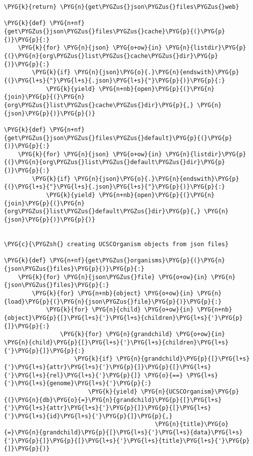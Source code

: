 \begin{Verbatim}[commandchars=\\\{\}]
    \PYG{k}{return} \PYG{n}{get\PYGZus{}json\PYGZus{}files\PYGZus{}web}

\PYG{k}{def} \PYG{n+nf}{get\PYGZus{}json\PYGZus{}files\PYGZus{}cache}\PYG{p}{(}\PYG{p}{)}\PYG{p}{:}
    \PYG{k}{for} \PYG{n}{json} \PYG{o+ow}{in} \PYG{n}{listdir}\PYG{p}{(}\PYG{n}{org\PYGZus{}list\PYGZus{}cache\PYGZus{}dir}\PYG{p}{)}\PYG{p}{:}
        \PYG{k}{if} \PYG{n}{json}\PYG{o}{.}\PYG{n}{endswith}\PYG{p}{(}\PYG{l+s}{"}\PYG{l+s}{.json}\PYG{l+s}{"}\PYG{p}{)}\PYG{p}{:}
            \PYG{k}{yield} \PYG{n+nb}{open}\PYG{p}{(}\PYG{n}{join}\PYG{p}{(}\PYG{n}{org\PYGZus{}list\PYGZus{}cache\PYGZus{}dir}\PYG{p}{,} \PYG{n}{json}\PYG{p}{)}\PYG{p}{)}

\PYG{k}{def} \PYG{n+nf}{get\PYGZus{}json\PYGZus{}files\PYGZus{}default}\PYG{p}{(}\PYG{p}{)}\PYG{p}{:}
    \PYG{k}{for} \PYG{n}{json} \PYG{o+ow}{in} \PYG{n}{listdir}\PYG{p}{(}\PYG{n}{org\PYGZus{}list\PYGZus{}default\PYGZus{}dir}\PYG{p}{)}\PYG{p}{:}
        \PYG{k}{if} \PYG{n}{json}\PYG{o}{.}\PYG{n}{endswith}\PYG{p}{(}\PYG{l+s}{"}\PYG{l+s}{.json}\PYG{l+s}{"}\PYG{p}{)}\PYG{p}{:}
            \PYG{k}{yield} \PYG{n+nb}{open}\PYG{p}{(}\PYG{n}{join}\PYG{p}{(}\PYG{n}{org\PYGZus{}list\PYGZus{}default\PYGZus{}dir}\PYG{p}{,} \PYG{n}{json}\PYG{p}{)}\PYG{p}{)}


\PYG{c}{\PYGZsh{} creating UCSCOrganism objects from json files}

\PYG{k}{def} \PYG{n+nf}{get\PYGZus{}organisms}\PYG{p}{(}\PYG{n}{json\PYGZus{}files}\PYG{p}{)}\PYG{p}{:}
    \PYG{k}{for} \PYG{n}{json\PYGZus{}file} \PYG{o+ow}{in} \PYG{n}{json\PYGZus{}files}\PYG{p}{:}
        \PYG{k}{for} \PYG{n+nb}{object} \PYG{o+ow}{in} \PYG{n}{load}\PYG{p}{(}\PYG{n}{json\PYGZus{}file}\PYG{p}{)}\PYG{p}{:}
            \PYG{k}{for} \PYG{n}{child} \PYG{o+ow}{in} \PYG{n+nb}{object}\PYG{p}{[}\PYG{l+s}{'}\PYG{l+s}{children}\PYG{l+s}{'}\PYG{p}{]}\PYG{p}{:}
                \PYG{k}{for} \PYG{n}{grandchild} \PYG{o+ow}{in} \PYG{n}{child}\PYG{p}{[}\PYG{l+s}{'}\PYG{l+s}{children}\PYG{l+s}{'}\PYG{p}{]}\PYG{p}{:}
                    \PYG{k}{if} \PYG{n}{grandchild}\PYG{p}{[}\PYG{l+s}{'}\PYG{l+s}{attr}\PYG{l+s}{'}\PYG{p}{]}\PYG{p}{[}\PYG{l+s}{'}\PYG{l+s}{rel}\PYG{l+s}{'}\PYG{p}{]} \PYG{o}{==} \PYG{l+s}{'}\PYG{l+s}{genome}\PYG{l+s}{'}\PYG{p}{:}
                        \PYG{k}{yield} \PYG{n}{UCSCOrganism}\PYG{p}{(}\PYG{n}{db}\PYG{o}{=}\PYG{n}{grandchild}\PYG{p}{[}\PYG{l+s}{'}\PYG{l+s}{attr}\PYG{l+s}{'}\PYG{p}{]}\PYG{p}{[}\PYG{l+s}{'}\PYG{l+s}{id}\PYG{l+s}{'}\PYG{p}{]}\PYG{p}{,}
                                           \PYG{n}{title}\PYG{o}{=}\PYG{n}{grandchild}\PYG{p}{[}\PYG{l+s}{'}\PYG{l+s}{data}\PYG{l+s}{'}\PYG{p}{]}\PYG{p}{[}\PYG{l+s}{'}\PYG{l+s}{title}\PYG{l+s}{'}\PYG{p}{]}\PYG{p}{)}
\end{Verbatim}


